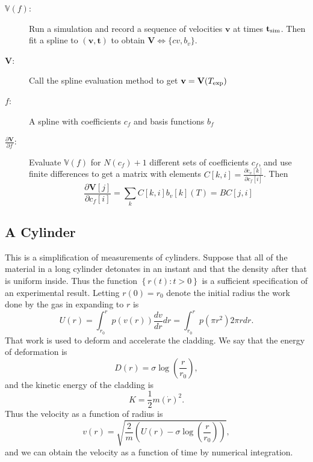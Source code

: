 \documentclass[11pt]{article}
\newcommand{\partiald}[2]{\frac{\partial #1}{\partial #2}}
\newcommand\bv{\mathbf{v}}
\newcommand\bt{\mathbf{t}}
\newcommand\Vfunc{\mathbb{V}}
\newcommand\Vt{\mathbf{V}}
\newcommand\texp{T_{\rm{exp}}}
\newcommand\cf{c_f}
\newcommand\cv{c_v}
\newcommand\fbasis{b_f}
\newcommand\vbasis{b_v}
\newcommand\tsim{{\mathbf t}_{\rm{sim}}}
\newcommand\DVDf{\partiald{\Vt}{f}}
\begin{document}
\begin{description}
\item[$\Vfunc(f)$:] Run a simulation and record a sequence of
  velocities $\bv$ at times $\tsim$.  Then fit a
  spline to $(\bv, \bt)$ to obtain $\Vt\iff \{cv,\vbasis\}$.
\item[$\Vt$:] Call the spline evaluation method to get $\bv = \Vt(\texp)$
\item[$f$:] A spline with coefficients $\cf$ and basis functions
  $\fbasis$
\item[$\DVDf$:] Evaluate $\Vfunc(f)$ for $N(\cf)+1$ different sets of
  coefficients $\cf$, and use finite differences to get a matrix with
  elements $C[k,i] = \partiald{\cv[k]}{\cf[i]}$.  Then
  \begin{equation*}
    \partiald{\Vt[j]}{\cf[i]} = \sum_k C[k,i] \vbasis[k](T) = BC[j,i]
  \end{equation*}
\end{description}

\subsection{A Cylinder}
\label{sec:cylinder}

This is a simplification of measurements of cylinders.  Suppose that
all of the material in a long cylinder detonates in an instant and
that the density after that is uniform inside.  Thus the function
$\left\{r(t): t>0 \right\}$ is a sufficient specification of an
experimental result.  Letting $r(0) = r_0$ denote the initial radius
the work done by the gas in expanding to $r$ is
\begin{equation*}
  U(r) = \int_{r_0}^r p(v(r)) \frac{dv}{dr} dr = \int_{r_0}^r p(\pi
  r^2) 2\pi r dr.
\end{equation*}
That work is used to deform and accelerate the cladding.  We say that
the energy of deformation is
\begin{equation*}
  D(r) = \sigma \log \left(\frac{r}{r_0} \right),
\end{equation*}
and the kinetic energy of the cladding is
\begin{equation*}
  K = \frac{1}{2} m \left( \dot r \right)^2.
\end{equation*}
Thus the velocity as a function of radius is
\begin{equation*}
  v(r) = \sqrt{\frac{2}{m} \left( U(r) - \sigma \log
      \left(\frac{r}{r_0} \right) \right) },
\end{equation*}
and we can obtain the velocity as a function of time by numerical
integration.
\end{document}
